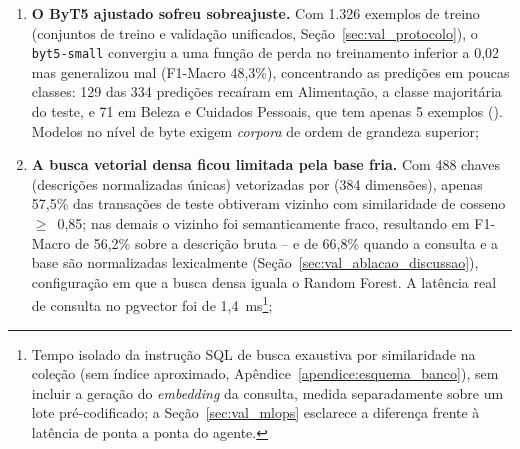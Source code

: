 \begin{enumerate}
	\item \textbf{O ByT5 ajustado sofreu sobreajuste.} Com 1.326 exemplos de treino (conjuntos de treino e validação unificados, Seção~\ref{sec:val_protocolo}), o
	\texttt{byt5-small} convergiu a uma função de perda no treinamento inferior a 0,02 mas
	generalizou mal (F1-Macro 48,3\%), concentrando as predições em poucas classes: 129 das 334 predições recaíram em Alimentação, a classe majoritária do teste, e 71 em Beleza e Cuidados Pessoais, que tem apenas 5 exemplos (). Modelos no nível de byte exigem
	\textit{corpora} de ordem de grandeza superior;

	\item \textbf{A busca vetorial densa ficou limitada pela base fria.} Com 488 chaves (descrições normalizadas únicas) vetorizadas por \modelemb{} (384 dimensões), apenas 57,5\% das transações de teste obtiveram vizinho com similaridade de cosseno $\ge$~0,85; nas demais o vizinho foi semanticamente fraco, resultando em F1-Macro de 56,2\% sobre a descrição bruta -- e de 66,8\% quando a consulta e a base são normalizadas lexicalmente (Seção~\ref{sec:val_ablacao_discussao}), configuração em que a busca densa iguala o Random Forest. A latência real de consulta no pgvector foi de 1,4~ms\footnote{Tempo isolado da instrução SQL de busca exaustiva por similaridade na coleção (sem índice aproximado, Apêndice~\ref{apendice:esquema_banco}), sem incluir a geração do \textit{embedding} da consulta, medida separadamente sobre um lote pré-codificado; a Seção~\ref{sec:val_mlops} esclarece a diferença frente à latência de ponta a ponta do agente.};


\end{enumerate}
